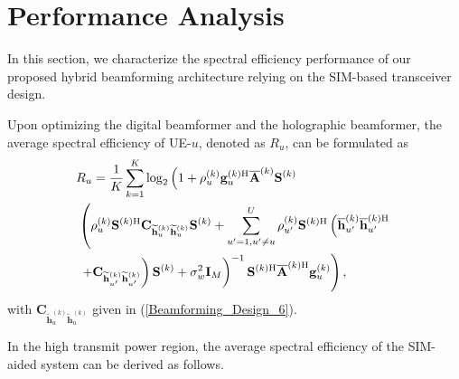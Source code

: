 \documentclass[lettersize,journal]{IEEEtran}
\theoremstyle{remark}
\begin{document}
\section{Performance Analysis}\label{Performance_Analysis}
In this section, we characterize the spectral efficiency performance of our proposed hybrid beamforming architecture relying on the SIM-based transceiver design.

Upon optimizing the digital beamformer and the holographic beamformer, the average spectral efficiency of UE-$u$, denoted as $R_u$, can be formulated as
\begin{align}\label{Performance_Analysis_1}
    \notag &R_u=\frac{1}{K}\sum_{k=1}^K\log_2\left(1+\rho_u^{(k)}\mathbf{g}_u^{(k)\mathrm{H}}
        \overline{\mathbf{A}}^{(k)}\mathbf{S}^{(k)}\right.\\
        \notag&\left.\left(
        \rho_u^{(k)}\mathbf{S}^{(k)\mathrm{H}}\mathbf{C}_{\widetilde{\mathbf{h}}_u^{(k)}
        \widetilde{\mathbf{h}}_u^{(k)}}\mathbf{S}^{(k)}
        +\sum_{u'=1,u'\neq u}^{U}\rho_{u'}^{(k)}
        \mathbf{S}^{(k)\mathrm{H}}\left(\overline{\mathbf{h}}_{u'}^{(k)}
        \overline{\mathbf{h}}_{u'}^{(k)\mathrm{H}}\right.\right.\right.\\
        &\left.\left.\left.+\mathbf{C}_{\widetilde{\mathbf{h}}_{u'}^{(k)}
        \widetilde{\mathbf{h}}_{u'}^{(k)}}\right)\mathbf{S}^{(k)}+\sigma_w^2\mathbf{I}_M\right)^{-1}
        \mathbf{S}^{(k)\mathrm{H}}\overline{\mathbf{A}}^{(k)\mathrm{H}}\mathbf{g}_u^{(k)}\right),
\end{align}
with $\mathbf{C}_{\widetilde{\mathbf{h}}_u^{(k)}\widetilde{\mathbf{h}}_u^{(k)}}$ given in (\ref{Beamforming_Design_6}).

In the high transmit power region, the average spectral efficiency of the SIM-aided system can be derived as follows.
\end{document}
